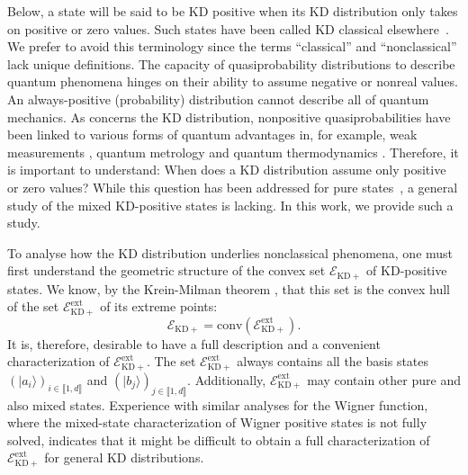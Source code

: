 \documentclass[a4paper, notitlepage, 11pt]{article}
\numberwithin{equation}{section}
\newcommand{\cket}[1]{|#1\rangle}
\newcommand{\EcalKDC}{{\mathcal E}_{\mathrm{KD+}}}
\newcommand{\EcalKDCext}{{\mathcal E}_{\mathrm{KD+}}^{\mathrm{ext}}}
\newcommand{\conv}[1]{\mathrm{conv}\left(#1\right)}
\newcommand{\IntEnt}[2]{\llbracket #1 , #2 \rrbracket}
\begin{document}
Below, a state will be said to be KD positive when its KD distribution only takes on positive or zero values. Such states have been called KD classical elsewhere~\cite{arvidsson-shukuretal2021, debievre2021, debievre2023a}. We prefer to avoid this terminology since the terms ``classical'' and ``nonclassical''  lack unique definitions. The capacity of quasiprobability distributions to describe quantum phenomena hinges on their ability to assume negative or nonreal values.  An always-positive (probability) distribution cannot describe all of quantum mechanics. As concerns the KD distribution, nonpositive quasiprobabilities have been linked to {various forms of} quantum advantages in, {for example, weak measurements \cite{pusey2014, Kunjwal19},  quantum metrology \cite{arvidsson-shukuretal2020, Jenne22} and quantum thermodynamics \cite{YuSwDr18,Levy20,Lostaglio20}.} Therefore, it is important to understand: {When does a KD  distribution  assume only positive or zero values?} While this question has been addressed for pure states~\cite{arvidsson-shukuretal2021, debievre2021, debievre2023a}, a general study of the mixed KD-positive states is lacking. {In this work, we provide such a study.}

To analyse how the KD distribution underlies nonclassical phenomena, one {must first} understand the geometric structure of the convex set $\EcalKDC$ of KD-positive states.  We know, by the Krein-Milman theorem \cite{hiriart-urrutylemarechal2001}, that this set is the convex hull of the set $\EcalKDCext$ of its extreme points:
$$
\EcalKDC=\conv{\EcalKDCext}.
$$
{It is, therefore, desirable}  to have a full description and a convenient characterization of $\EcalKDCext$. The set $\EcalKDCext$  always contains all the  basis states $ \left(\cket{a_i}\right)_{i\in\IntEnt{1}{d}}$ and $\left(\cket{b_j}\right)_{j\in\IntEnt{1}{d}}$. {Additionally, $\EcalKDCext$}  may contain other pure and also mixed states. Experience with similar {analyses} for the Wigner function, where  {the mixed-state characterization of Wigner positive states is} not  fully solved, indicates that it might be {difficult to obtain a full characterization of  $\EcalKDCext$ for } general KD distributions.
\end{document}
